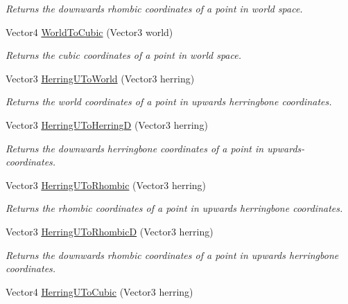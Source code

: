 \begin{DoxyCompactItemize}
\begin{DoxyCompactList}\small\item\em Returns the downwards rhombic coordinates of a point in world space.\end{DoxyCompactList}\item 
Vector4 \hyperlink{class_g_f_hex_grid_a77f39b12ba07df6135bd28941e30d9ff_a77f39b12ba07df6135bd28941e30d9ff}{World\+To\+Cubic} (Vector3 world)
\begin{DoxyCompactList}\small\item\em Returns the cubic coordinates of a point in world space.\end{DoxyCompactList}\item 
Vector3 \hyperlink{class_g_f_hex_grid_a376663e9575f6e1f3937c7f768070a5c_a376663e9575f6e1f3937c7f768070a5c}{Herring\+U\+To\+World} (Vector3 herring)
\begin{DoxyCompactList}\small\item\em Returns the world coordinates of a point in upwards herringbone coordinates.\end{DoxyCompactList}\item 
Vector3 \hyperlink{class_g_f_hex_grid_a261551484b05ea71dcc5b442dbf2e0f0_a261551484b05ea71dcc5b442dbf2e0f0}{Herring\+U\+To\+Herring\+D} (Vector3 herring)
\begin{DoxyCompactList}\small\item\em Returns the downwards herringbone coordinates of a point in upwards-\/ coordinates.\end{DoxyCompactList}\item 
Vector3 \hyperlink{class_g_f_hex_grid_a5352c5998878b421c1d117958ca2591d_a5352c5998878b421c1d117958ca2591d}{Herring\+U\+To\+Rhombic} (Vector3 herring)
\begin{DoxyCompactList}\small\item\em Returns the rhombic coordinates of a point in upwards herringbone coordinates.\end{DoxyCompactList}\item 
Vector3 \hyperlink{class_g_f_hex_grid_aff4d8a69e8a6dca3c4364338e5fef855_aff4d8a69e8a6dca3c4364338e5fef855}{Herring\+U\+To\+Rhombic\+D} (Vector3 herring)
\begin{DoxyCompactList}\small\item\em Returns the downwards rhombic coordinates of a point in upwards herringbone coordinates.\end{DoxyCompactList}\item 
Vector4 \hyperlink{class_g_f_hex_grid_af755aa27158a1b137c1f45b65a780d03_af755aa27158a1b137c1f45b65a780d03}{Herring\+U\+To\+Cubic} (Vector3 herring)

\end{DoxyCompactItemize}
